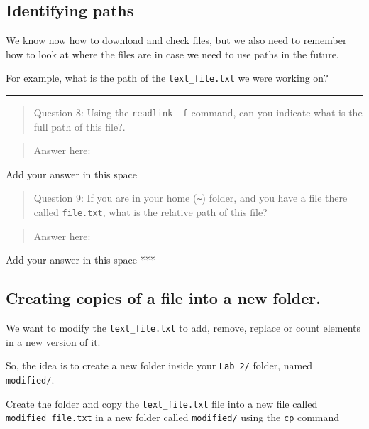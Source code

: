 \documentclass[
]{book}
\begin{document}
\hypertarget{identifying-paths}{%
\subsection{Identifying paths}\label{identifying-paths}}

We know now how to download and check files, but we also need to remember how to look at where the files are in case we need to use paths in the future.

For example, what is the path of the \texttt{text\_file.txt} we were working on?

\begin{center}\rule{0.5\linewidth}{0.5pt}\end{center}

\begin{quote}
Question 8: Using the \texttt{readlink\ -f} command, can you indicate what is the full path of this file?.
\end{quote}

\begin{quote}
Answer here:
\end{quote}

{Add your answer in this space}

\begin{quote}
Question 9: If you are in your home (\texttt{\textasciitilde{}}) folder, and you have a file there called \texttt{file.txt}, what is the relative path of this file?
\end{quote}

\begin{quote}
Answer here:
\end{quote}

{Add your answer in this space}
***

\hypertarget{creating-copies-of-a-file-into-a-new-folder.}{%
\subsection{Creating copies of a file into a new folder.}\label{creating-copies-of-a-file-into-a-new-folder.}}

We want to modify the \texttt{text\_file.txt} to add, remove, replace or count elements in a new version of it.

So, the idea is to create a new folder inside your \texttt{Lab\_2/} folder, named \texttt{modified/}.

Create the folder and copy the \texttt{text\_file.txt} file into a new file called \texttt{modified\_file.txt} in a new folder called \texttt{modified/} using the \texttt{cp} command
\end{document}
